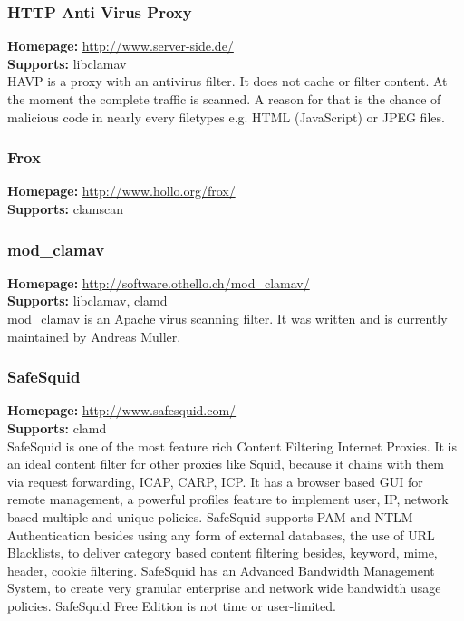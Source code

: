\documentclass[a4paper,titlepage,12pt]{article}
\begin{document}
    \subsubsection{HTTP Anti Virus Proxy}
    \textbf{Homepage:} \url{http://www.server-side.de/}\\
    \textbf{Supports:} libclamav\\[4pt]
    HAVP is a proxy with an antivirus filter. It does not cache or filter
    content. At the moment the complete traffic is scanned. A reason for that
    is the chance of malicious code in nearly every filetypes e.g. HTML
    (JavaScript) or JPEG files.

    \subsubsection{Frox}
    \textbf{Homepage:} \url{http://www.hollo.org/frox/}\\
    \textbf{Supports:} clamscan\\[4pt]

    \subsubsection{mod\_clamav}
    \textbf{Homepage:} \url{http://software.othello.ch/mod_clamav/}\\
    \textbf{Supports:} libclamav, clamd\\[4pt]
    mod\_clamav is an Apache virus scanning filter. It was written
    and is currently maintained by Andreas Muller.

    \subsubsection{SafeSquid}
    \textbf{Homepage:} \url{http://www.safesquid.com/}\\
    \textbf{Supports:} clamd\\[4pt]
    SafeSquid is one of the most feature rich Content Filtering Internet
    Proxies. It is an ideal content filter for other proxies like Squid,
    because it chains with them via request forwarding, ICAP, CARP, ICP. It
    has a browser based GUI for remote management, a powerful profiles feature
    to implement user, IP, network based multiple and unique policies.
    SafeSquid supports PAM and NTLM Authentication besides using any form of
    external databases, the use of URL Blacklists, to deliver category based
    content filtering besides, keyword, mime, header, cookie filtering.
    SafeSquid has an Advanced Bandwidth Management System, to create very
    granular enterprise and network wide bandwidth usage policies. SafeSquid
    Free Edition is not time or user-limited.
\end{document}
